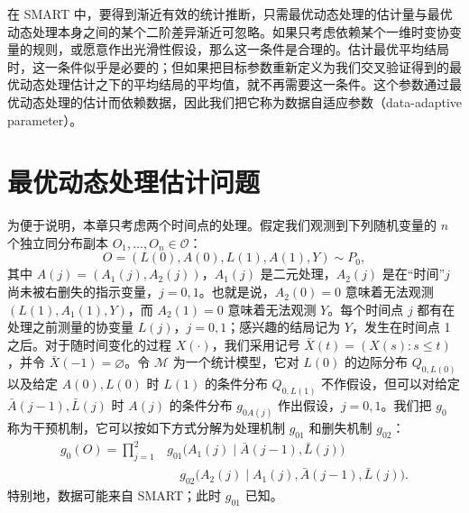 在 SMART 中，要得到渐近有效的统计推断，只需最优动态处理的估计量与最优动态处理本身之间的某个二阶差异渐近可忽略。如果只考虑依赖某个一维时变协变量的规则，或愿意作出光滑性假设，那么这一条件是合理的。估计最优平均结局时，这一条件似乎是必要的；但如果把目标参数重新定义为我们交叉验证得到的最优动态处理估计之下的平均结局的平均值，就不再需要这一条件。这个参数通过最优动态处理的估计而依赖数据，因此我们把它称为数据自适应参数（data-adaptive parameter）。

\section{最优动态处理估计问题}

为便于说明，本章只考虑两个时间点的处理。假定我们观测到下列随机变量的 $n$ 个独立同分布副本 $O_1,\ldots,O_n\in\mathcal O$：
\[
 O=(L(0),A(0),L(1),A(1),Y)\sim P_0,
\]
其中 $A(j)=(A_1(j),A_2(j))$，$A_1(j)$ 是二元处理，$A_2(j)$ 是在“时间”$j$ 尚未被右删失的指示变量，$j=0,1$。也就是说，$A_2(0)=0$ 意味着无法观测 $(L(1),A_1(1),Y)$，而 $A_2(1)=0$ 意味着无法观测 $Y$。每个时间点 $j$ 都有在处理之前测量的协变量 $L(j)$，$j=0,1$；感兴趣的结局记为 $Y$，发生在时间点 1 之后。对于随时间变化的过程 $X(\cdot)$，我们采用记号 $\bar X(t)=(X(s):s\leq t)$，并令 $\bar X(-1)=\varnothing$。令 $\mathcal M$ 为一个统计模型，它对 $L(0)$ 的边际分布 $Q_{0,L(0)}$ 以及给定 $A(0),L(0)$ 时 $L(1)$ 的条件分布 $Q_{0,L(1)}$ 不作假设，但可以对给定 $\bar A(j-1),\bar L(j)$ 时 $A(j)$ 的条件分布 $g_{0A(j)}$ 作出假设，$j=0,1$。我们把 $g_0$ 称为干预机制，它可以按如下方式分解为处理机制 $g_{01}$ 和删失机制 $g_{02}$：
\[
\begin{aligned}
 g_0(O)=\prod_{j=1}^{2}
 &g_{01}\bigl(A_1(j)\mid\bar A(j-1),\bar L(j)\bigr)\\
 &\quad g_{02}\bigl(A_2(j)\mid A_1(j),\bar A(j-1),\bar L(j)\bigr).
\end{aligned}
\]
特别地，数据可能来自 SMART；此时 $g_{01}$ 已知。

